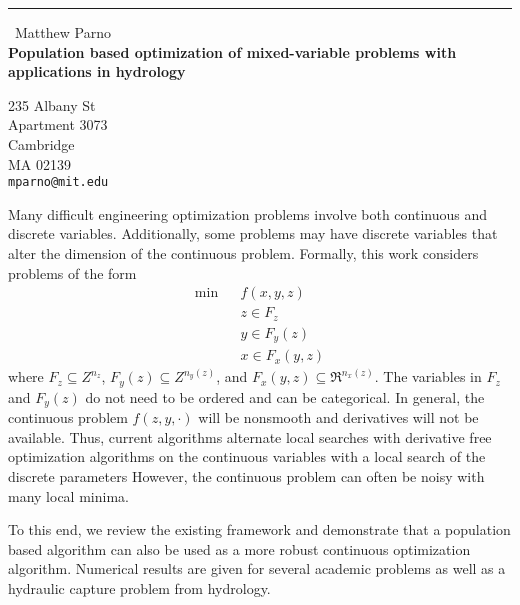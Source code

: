 \documentclass{report}
\begin{document}
\begin{center}
\rule{6in}{1pt} \
{\large Matthew Parno \\
{\bf Population based optimization of mixed-variable problems with applications in hydrology}}

235 Albany St \\ Apartment 3073 \\ Cambridge \\ MA 02139
\\
{\tt mparno@mit.edu}\end{center}

Many difficult engineering optimization problems involve both continuous
and discrete variables. Additionally, some problems may have discrete
variables that alter the dimension of the continuous problem. Formally,
this work considers problems of the form
\begin{eqnarray*}
\mbox{min}& & f(x,y,z)\\
& & z\in F_z \\
& & y \in F_y(z)\\
& & x \in F_x(y,z)
\end{eqnarray*}
where $F_z\subseteq Z^{n_z}$, $F_y(z)\subseteq Z^{n_y(z)}$, and
$F_x(y,z)\subseteq \Re^{n_x(z)}$. The variables in $F_z$ and $F_y(z)$ do
not need to be ordered and can be categorical. In general, the continuous
problem $f(z,y,\cdot )$ will be nonsmooth and derivatives will not be
available. Thus, current algorithms alternate local searches with
derivative free optimization algorithms on the continuous variables with
a local search of the discrete parameters However, the continuous problem
can often be noisy with many local minima.

To this end, we review the existing framework and demonstrate that a
population based algorithm can also be used as a more robust continuous
optimization algorithm. Numerical results are given for several academic
problems as well as a hydraulic capture problem from hydrology.
\end{document}

